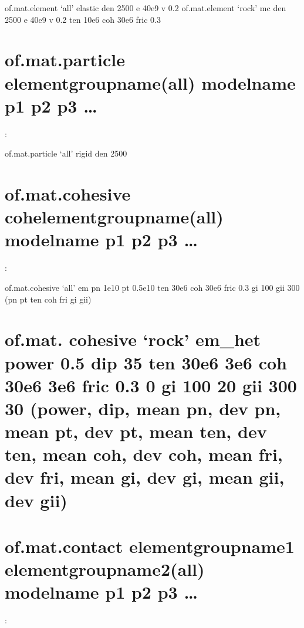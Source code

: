 \documentclass[letterpaper,10pt,english]{sphinxmanual}
\begin{document}
\begin{sphinxVerbatim}[commandchars=\\\{\}]
of.mat.element ‘all’ elastic den 2500 e 40e9 v 0.2
of.mat.element ‘rock’ mc den 2500 e 40e9 v 0.2 ten 10e6 coh 30e6 fric 0.3
\end{sphinxVerbatim}


\section{of.mat.particle elementgroupname(all) modelname p1 p2 p3 …}
\label{\detokenize{rst_tutorials/command_line_guide:of-mat-particle-elementgroupname-all-modelname-p1-p2-p3}}
:

\begin{sphinxVerbatim}[commandchars=\\\{\}]
of.mat.particle ‘all’ rigid den 2500
\end{sphinxVerbatim}


\section{of.mat.cohesive cohelementgroupname(all) modelname p1 p2 p3 …}
\label{\detokenize{rst_tutorials/command_line_guide:of-mat-cohesive-cohelementgroupname-all-modelname-p1-p2-p3}}
:

\begin{sphinxVerbatim}[commandchars=\\\{\}]
of.mat.cohesive ‘all’ em pn 1e10 pt 0.5e10 ten 30e6 coh 30e6 fric 0.3 gi 100 gii 300 (pn pt ten coh fri gi gii)
\end{sphinxVerbatim}


\section{of.mat. cohesive ‘rock’ em\_het power 0.5 dip 35 ten 30e6 3e6 coh 30e6 3e6 fric 0.3 0 gi 100 20 gii 300 30 (power, dip, mean pn, dev pn, mean pt, dev pt, mean ten, dev ten, mean coh, dev coh, mean fri, dev fri, mean gi, dev gi, mean gii, dev gii)}
\label{\detokenize{rst_tutorials/command_line_guide:of-mat-cohesive-rock-em-het-power-0-5-dip-35-ten-30e6-3e6-coh-30e6-3e6-fric-0-3-0-gi-100-20-gii-300-30-power-dip-mean-pn-dev-pn-mean-pt-dev-pt-mean-ten-dev-ten-mean-coh-dev-coh-mean-fri-dev-fri-mean-gi-dev-gi-mean-gii-dev-gii}}

\section{of.mat.contact elementgroupname1 elementgroupname2(all) modelname p1 p2 p3 …}
\label{\detokenize{rst_tutorials/command_line_guide:of-mat-contact-elementgroupname1-elementgroupname2-all-modelname-p1-p2-p3}}\label{\detokenize{rst_tutorials/command_line_guide:section-16}}
:
\end{document}

